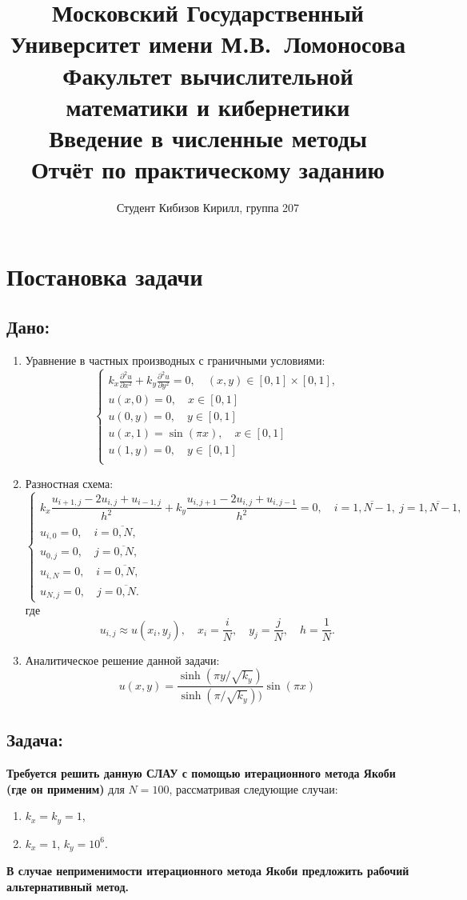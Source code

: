 \documentclass[a4paper, fleqn]{report}
\title{
\textbf{Московский Государственный Университет имени М.В.\ Ломоносова}\\
\textbf{Факультет вычислительной математики и кибернетики}\\
\textbf{Введение в численные методы}\\
Отчёт по практическому заданию
}
\author{
Студент Кибизов Кирилл, группа 207
}
\date{\number\year}
\begin{document}
\maketitle

\tableofcontents

\chapter{Постановка задачи}

\section*{Дано:}
\begin{enumerate}[label=\arabic*.]
\item Уравнение в частных производных с граничными условиями:
\[
\begin{cases}
k_x \frac{\partial^2 u}{\partial x^2} + k_y \frac{\partial^2 u}{\partial y^2} = 0, \quad (x, y) \in [0, 1] \times [0, 1], \\
u(x, 0) = 0, \quad x \in [0, 1] \\
u(0, y) = 0, \quad y \in [0, 1] \\
u(x, 1) = \sin(\pi x), \quad x \in [0, 1] \\
u(1, y) = 0, \quad y \in [0, 1] \\
\end{cases}
\]
\item Разностная схема:
\[
\begin{cases}
k_x \dfrac{u_{i+1,j} - 2u_{i,j} + u_{i-1,j}}{h^2} + k_y \dfrac{u_{i,j+1} - 2u_{i,j} + u_{i,j-1}}{h^2} = 0, \quad i = \overline{1,N-1},\ j = \overline{1,N-1}, \\
u_{i,0} = 0, \quad i = \overline{0,N}, \\
u_{0,j} = 0, \quad j = \overline{0,N}, \\
u_{i,N} = 0, \quad i = \overline{0,N}, \\
u_{N,j} = 0, \quad j = \overline{0,N}.
\end{cases}
\]
где
\[
u_{i,j} \approx u(x_i, y_j), \quad x_i = \dfrac{i}{N}, \quad y_j = \dfrac{j}{N}, \quad h = \dfrac{1}{N}.
\]
\item Аналитическое решение данной задачи:
\[
u(x, y) = \dfrac{\sinh(\pi y / \sqrt{k_y})}{\sinh(\pi / \sqrt{k_y}))} \sin(\pi x)
\]
\end{enumerate}

\section*{Задача:}
\textbf{Требуется решить данную СЛАУ с помощью итерационного метода Якоби (где он применим)} для $N = 100$, рассматривая следующие случаи:
\begin{enumerate}
    \item $k_x = k_y = 1$,
    \item $k_x = 1$, $k_y = 10^6$.
\end{enumerate}
\textbf{В случае неприменимости итерационного метода Якоби предложить рабочий альтернативный метод.}
\end{document}
